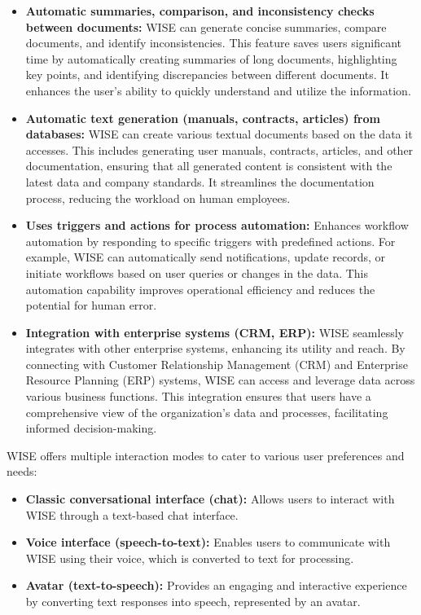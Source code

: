 \begin{itemize}
    \item \textbf{Automatic summaries, comparison, and inconsistency checks between documents:} WISE can generate concise summaries, compare documents, and identify inconsistencies. This feature saves users significant time by automatically creating summaries of long documents, highlighting key points, and identifying discrepancies between different documents. It enhances the user's ability to quickly understand and utilize the information.
    
    \item \textbf{Automatic text generation (manuals, contracts, articles) from databases:} WISE can create various textual documents based on the data it accesses. This includes generating user manuals, contracts, articles, and other documentation, ensuring that all generated content is consistent with the latest data and company standards. It streamlines the documentation process, reducing the workload on human employees.
    
    \item \textbf{Uses triggers and actions for process automation:} Enhances workflow automation by responding to specific triggers with predefined actions. For example, WISE can automatically send notifications, update records, or initiate workflows based on user queries or changes in the data. This automation capability improves operational efficiency and reduces the potential for human error.
    
    \item \textbf{Integration with enterprise systems (CRM, ERP):} WISE seamlessly integrates with other enterprise systems, enhancing its utility and reach. By connecting with Customer Relationship Management (CRM) and Enterprise Resource Planning (ERP) systems, WISE can access and leverage data across various business functions. This integration ensures that users have a comprehensive view of the organization's data and processes, facilitating informed decision-making.
\end{itemize}

WISE offers multiple interaction modes to cater to various user preferences and needs:

\begin{itemize}
    \item \textbf{Classic conversational interface (chat):} Allows users to interact with WISE through a text-based chat interface.
    \item \textbf{Voice interface (speech-to-text):} Enables users to communicate with WISE using their voice, which is converted to text for processing.
    \item \textbf{Avatar (text-to-speech):} Provides an engaging and interactive experience by converting text responses into speech, represented by an avatar.
\end{itemize}

